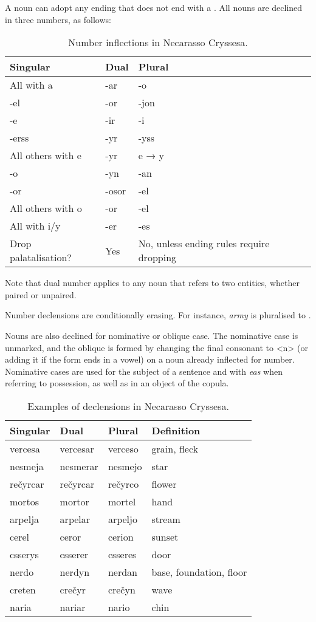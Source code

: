 \documentclass{book}
\begin{document}
A noun can adopt any ending that does not end with a . All nouns are declined in three numbers, as follows:

\begin{table}[h]
  \caption{Number inflections in Necarasso Cryssesa.}
  \centering
  \begin{tabu}{|X|X|X|}
    \hline
    Singular & Dual & Plural \\ \hline
    All with a & -ar & -o \\ \hline
    -el & -or & -jon \\
    -e & -ir & -i \\
    -erss & -yr & -yss \\
    All others with e & -yr & e → y \\ \hline
    -o & -yn & -an \\
    -or & -osor & -el \\
    All others with o & -or & -el \\ \hline
    All with i/y & -er & -es \\ \hline
   Drop palatalisation? & Yes & No, unless ending rules require dropping \\ \hline
  \end{tabu}
\end{table}

Note that dual number applies to any noun that refers to two entities, whether paired or unpaired.

Number declensions are conditionally erasing. For instance,  \emph{army} is pluralised to .

Nouns are also declined for nominative or oblique case. The nominative case is unmarked, and the oblique is formed by changing the final consonant to <n> (or adding it if the form ends in a vowel) on a noun already inflected for number. Nominative cases are used for the subject of a sentence and with \emph{eas} when referring to possession, as well as in an object of the copula.

\begin{table}[htb]
  \caption{Examples of declensions in Necarasso Cryssesa.}
  \centering
  \begin{tabular}{|l|l|l|l|}
    \hline
    Singular & Dual & Plural & Definition \\ \hline
    vercesa & vercesar & verceso & grain, fleck \\
    nesmeja & nesmerar & nesmejo & star \\
    rečyrcar & rečyrcar & rečyrco & flower \\
    mortos & mortor & mortel & hand \\
    arpelja & arpelar & arpeljo & stream \\
    cerel & ceror & cerion & sunset \\
    csserys & csserer & csseres & door \\
    nerdo & nerdyn & nerdan & base, foundation, floor \\
    creten & crečyr & crečyn & wave \\
    naria & nariar & nario & chin \\ \hline
  \end{tabular}
\end{table}
\end{document}
